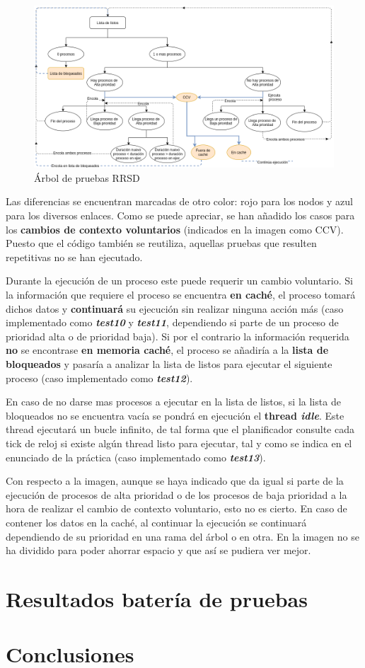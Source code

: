 \documentclass[10pt, spanish, pdftex]{template/UC3M_document}
\begin{document}
\vspace{0.5cm}
\begin{figure}[h]
    \centering
    \includegraphics[width=15cm]{arboles/RRSD.png}
    \caption{Árbol de pruebas RRSD}
\end{figure}

Las diferencias se encuentran marcadas de otro color: rojo para los nodos y azul para los diversos enlaces. Como se puede apreciar, se han añadido los casos para los \textbf{cambios de contexto voluntarios} (indicados en la imagen como CCV). Puesto que el código también se reutiliza, aquellas pruebas que resulten repetitivas no se han ejecutado.

Durante la ejecución de un proceso este puede requerir un cambio voluntario. Si la información que requiere el proceso se encuentra \textbf{en caché}, el proceso tomará dichos datos y \textbf{continuará} su ejecución sin realizar ninguna acción más (caso implementado como \textbf{\textit{test10}} y \textbf{\textit{test11}}, dependiendo si parte de un proceso de prioridad alta o de prioridad baja). Si por el contrario la información requerida \textbf{no} se encontrase \textbf{en memoria caché}, el proceso se añadiría a la \textbf{lista de bloqueados} y pasaría a analizar la lista de listos para ejecutar el siguiente proceso (caso implementado como \textbf{\textit{test12}}).

En caso de no darse mas procesos a ejecutar en la lista de listos, si la lista de bloqueados no se encuentra vacía se pondrá en ejecución el \textbf{thread \textit{idle}}. Este thread ejecutará un bucle infinito, de tal forma que el planificador consulte cada tick de reloj si existe algún thread listo para ejecutar, tal y como se indica en el enunciado de la práctica (caso implementado como \textbf{\textit{test13}}). 

Con respecto a la imagen, aunque se haya indicado que da igual si parte de la ejecución de procesos de alta prioridad o de los procesos de baja prioridad a la hora de realizar el cambio de contexto voluntario, esto no es cierto. En caso de contener los datos en la caché, al continuar la ejecución se continuará dependiendo de su prioridad en una rama del árbol o en otra. En la imagen no se ha dividido para poder ahorrar espacio y que así se pudiera ver mejor.

\vspace{1cm}
\section{Resultados batería de pruebas}

\newpage
\section{Conclusiones}
\end{document}
